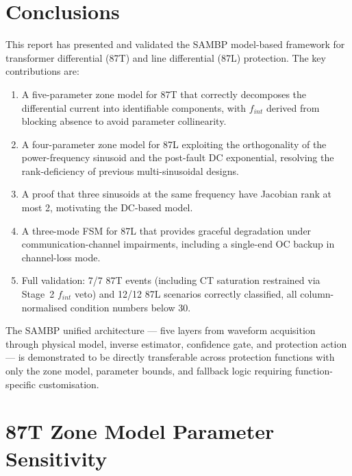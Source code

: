 \documentclass[12pt,a4paper]{article}
\begin{document}
\section{Conclusions}
\label{sec:conclusions}

This report has presented and validated the SAMBP model-based framework for
transformer differential (87T) and line differential (87L) protection.  The
key contributions are:

\begin{enumerate}
  \item A five-parameter zone model for 87T that correctly decomposes the
        differential current into identifiable components, with $f_{int}$
        derived from blocking absence to avoid parameter collinearity.
  \item A four-parameter zone model for 87L exploiting the orthogonality of
        the power-frequency sinusoid and the post-fault DC exponential,
        resolving the rank-deficiency of previous multi-sinusoidal designs.
  \item A proof that three sinusoids at the same frequency have Jacobian
        rank at most 2, motivating the DC-based model.
  \item A three-mode FSM for 87L that provides graceful degradation under
        communication-channel impairments, including a single-end OC backup
        in channel-loss mode.
  \item Full validation: 7/7 87T events (including CT saturation restrained
        via Stage~2 $f_{int}$ veto) and 12/12 87L scenarios correctly
        classified, all column-normalised condition numbers below 30.
\end{enumerate}

The SAMBP unified architecture --- five layers from waveform acquisition
through physical model, inverse estimator, confidence gate, and protection
action --- is demonstrated to be directly transferable across protection
functions with only the zone model, parameter bounds, and fallback logic
requiring function-specific customisation.

\appendix

\section{87T Zone Model Parameter Sensitivity}
\label{app:87T_sensitivity}
\end{document}
